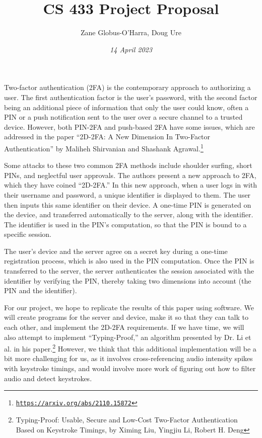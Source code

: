 \documentclass{article} %
\title{CS 433 Project Proposal}
\author{Zane Globus-O'Harra, Doug Ure}
\date{\textit{14 April 2023}}
\begin{document}
\maketitle

Two-factor authentication (2FA) is the contemporary approach to
authorizing a user. The first authentication factor is the user's
password, with the second factor being an additional piece of
information that only the user could know, often a PIN or a push
notification sent to the user over a secure channel to a trusted device. However, both
PIN-2FA and push-based 2FA have some issues, which are addressed in the
paper ``2D-2FA: A New Dimension In Two-Factor Authentication'' by
Maliheh Shirvanian and Shashank
Agrawal.\footnote{\href{https://arxiv.org/abs/2110.15872}{\texttt{https://arxiv.org/abs/2110.15872}}}

Some attacks to these two common 2FA methods include shoulder surfing,
short PINs, and neglectful user approvals. The authors present a new
approach to 2FA, which they have coined ``2D-2FA.'' In this new
approach, when a user logs in with their username and password, a
unique identifier is displayed to them. The user then inputs
this same identifier on their device. A one-time PIN is generated on the
device, and transferred automatically to the server, along with the
identifier. The identifier is used in the PIN's computation, so that the
PIN is bound to a specific session. 

The user's device and the server agree on a secret key during a one-time
registration process, which is also used in the PIN computation. Once
the PIN is transferred to the server, the server authenticates the
session associated with the identifier by verifying the PIN, thereby
taking two dimensions into account (the PIN and the identifier).

For our project, we hope to replicate the results of this paper using
software. We will create programs for the server and device, make it so
that they can talk to each other, and implement the 2D-2FA requirements.
If we have time, we will also attempt to implement ``Typing-Proof,'' an
algorithm presented by Dr. Li et al. in his
paper.\footnote{Typing-Proof: Usable, Secure and Low-Cost Two-Factor
Authentication Based on Keystroke Timings, by Ximing Liu, Yingjiu Li,
Robert H. Deng} However, we think that this additional implementation
will be a bit more challenging for us, as it involves cross-referencing
audio intensity spikes with keystroke timings, and would involve
more work of figuring out how to filter audio and detect keystrokes.
\end{document}
